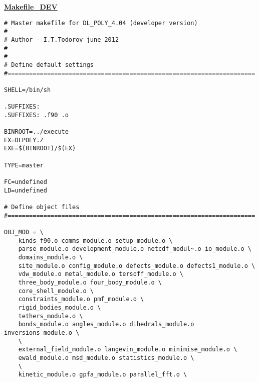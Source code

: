 \label{makefiles}
{\sc \bf \underline{Makefile\_DEV}}
\begin{verbatim}
# Master makefile for DL_POLY_4.04 (developer version)
#
# Author - I.T.Todorov june 2012
#
#
# Define default settings
#=====================================================================

SHELL=/bin/sh

.SUFFIXES:
.SUFFIXES: .f90 .o

BINROOT=../execute
EX=DLPOLY.Z
EXE=$(BINROOT)/$(EX)

TYPE=master

FC=undefined
LD=undefined

# Define object files
#=====================================================================

OBJ_MOD = \
	kinds_f90.o comms_module.o setup_module.o \
	parse_module.o development_module.o netcdf_modul~.o io_module.o \
	domains_module.o \
	site_module.o config_module.o defects_module.o defects1_module.o \
	vdw_module.o metal_module.o tersoff_module.o \
	three_body_module.o four_body_module.o \
	core_shell_module.o \
	constraints_module.o pmf_module.o \
	rigid_bodies_module.o \
	tethers_module.o \
	bonds_module.o angles_module.o dihedrals_module.o inversions_module.o \
	\
	external_field_module.o langevin_module.o minimise_module.o \
	ewald_module.o msd_module.o statistics_module.o \
	\
	kinetic_module.o gpfa_module.o parallel_fft.o \


\end{verbatim}
